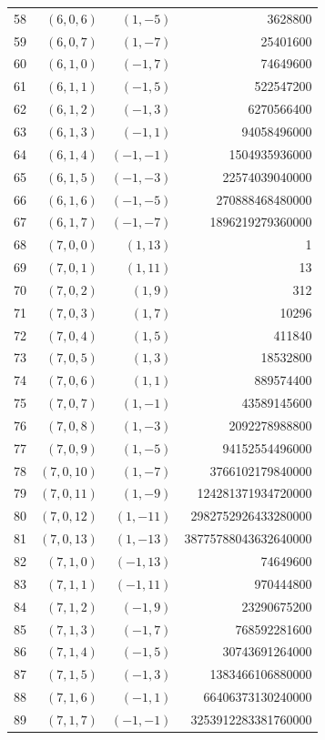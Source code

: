\begin{longtable}{rrrr}
58 & $(6,0,6)$ & $(1,-5)$ & 3628800\\
59 & $(6,0,7)$ & $(1,-7)$ & 25401600\\
60 & $(6,1,0)$ & $(-1,7)$ & 74649600\\
61 & $(6,1,1)$ & $(-1,5)$ & 522547200\\
62 & $(6,1,2)$ & $(-1,3)$ & 6270566400\\
63 & $(6,1,3)$ & $(-1,1)$ & 94058496000\\
64 & $(6,1,4)$ & $(-1,-1)$ & 1504935936000\\
65 & $(6,1,5)$ & $(-1,-3)$ & 22574039040000\\
66 & $(6,1,6)$ & $(-1,-5)$ & 270888468480000\\
67 & $(6,1,7)$ & $(-1,-7)$ & 1896219279360000\\
68 & $(7,0,0)$ & $(1,13)$ & 1\\
69 & $(7,0,1)$ & $(1,11)$ & 13\\
70 & $(7,0,2)$ & $(1,9)$ & 312\\
71 & $(7,0,3)$ & $(1,7)$ & 10296\\
72 & $(7,0,4)$ & $(1,5)$ & 411840\\
73 & $(7,0,5)$ & $(1,3)$ & 18532800\\
74 & $(7,0,6)$ & $(1,1)$ & 889574400\\
75 & $(7,0,7)$ & $(1,-1)$ & 43589145600\\
76 & $(7,0,8)$ & $(1,-3)$ & 2092278988800\\
77 & $(7,0,9)$ & $(1,-5)$ & 94152554496000\\
78 & $(7,0,10)$ & $(1,-7)$ & 3766102179840000\\
79 & $(7,0,11)$ & $(1,-9)$ & 124281371934720000\\
80 & $(7,0,12)$ & $(1,-11)$ & 2982752926433280000\\
81 & $(7,0,13)$ & $(1,-13)$ & 38775788043632640000\\
82 & $(7,1,0)$ & $(-1,13)$ & 74649600\\
83 & $(7,1,1)$ & $(-1,11)$ & 970444800\\
84 & $(7,1,2)$ & $(-1,9)$ & 23290675200\\
85 & $(7,1,3)$ & $(-1,7)$ & 768592281600\\
86 & $(7,1,4)$ & $(-1,5)$ & 30743691264000\\
87 & $(7,1,5)$ & $(-1,3)$ & 1383466106880000\\
88 & $(7,1,6)$ & $(-1,1)$ & 66406373130240000\\
89 & $(7,1,7)$ & $(-1,-1)$ & 3253912283381760000\\

\end{longtable}
